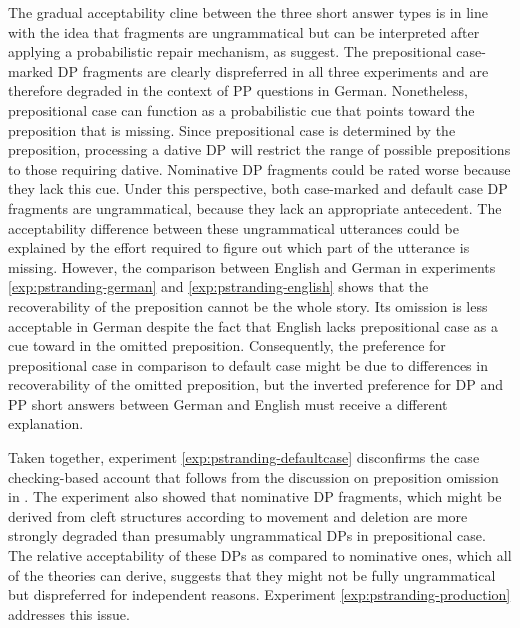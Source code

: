 The gradual acceptability cline between the three short answer types is in line with the idea that fragments are ungrammatical but can be interpreted after applying a probabilistic repair mechanism, as \citet{bergen.goodman2015} suggest. The prepositional case-marked DP fragments are clearly dispreferred in all three experiments and are therefore degraded in the context of PP questions in German. Nonetheless, prepositional case can function as a probabilistic cue that points toward the preposition that is missing. Since prepositional case is determined by the preposition, processing a dative DP will restrict the range of possible prepositions to those requiring dative. Nominative DP fragments could be rated worse because they lack this cue. Under this perspective, both case-marked and default case DP fragments are ungrammatical, because they lack an appropriate antecedent. The acceptability difference between these ungrammatical utterances could be explained by the effort required to figure out which part of the utterance is missing. However, the comparison between English and German in experiments \ref{exp:pstranding-german} and \ref{exp:pstranding-english} shows that the recoverability of the preposition cannot be the whole story. Its omission is less acceptable in German despite the fact that English lacks prepositional case as a cue toward in the omitted preposition. Consequently, the preference for prepositional case in comparison to default case might be due to differences in recoverability of the omitted preposition, but the inverted preference for DP and PP short answers between German and English must receive a different explanation. 

Taken together, experiment \ref{exp:pstranding-defaultcase} disconfirms the case checking-based account that follows from the discussion on preposition omission in \citet{barton.progovac2005}. The experiment also showed that nominative DP fragments, which might be derived from cleft structures according to movement and deletion are more strongly degraded than presumably ungrammatical DPs in prepositional case. The relative acceptability of these DPs as compared to nominative ones, which all of the theories can derive, suggests that they might not be fully ungrammatical but dispreferred for independent reasons. Experiment \ref{exp:pstranding-production} addresses this issue.

